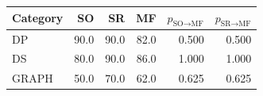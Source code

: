\begin{tabular}{@{}lrrrrr@{}}
\toprule
Category & SO & SR & MF & $p_{\text{SO}\!\to\!\text{MF}}$ & $p_{\text{SR}\!\to\!\text{MF}}$ \\
\midrule
DP & 90.0 & 90.0 & 82.0 & 0.500 & 0.500 \\
DS & 80.0 & 90.0 & 86.0 & 1.000 & 1.000 \\
GRAPH & 50.0 & 70.0 & 62.0 & 0.625 & 0.625 \\
\bottomrule
\end{tabular}
